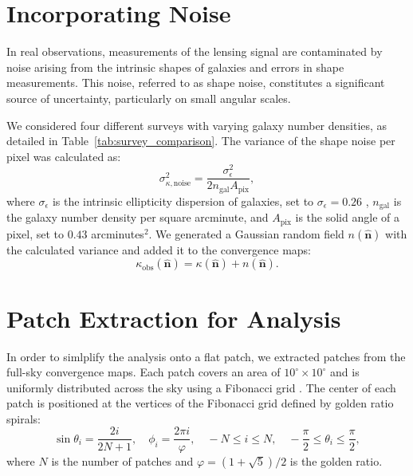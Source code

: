 \section{Incorporating Noise}
In real observations, measurements of the lensing signal are contaminated by noise arising from the intrinsic shapes of galaxies and errors in shape measurements. This noise, referred to as shape noise, constitutes a significant source of uncertainty, particularly on small angular scales.

We considered four different surveys with varying galaxy number densities, as detailed in Table~\ref{tab:survey_comparison}.
The variance of the shape noise per pixel was calculated as:
\begin{equation}
    \sigma_{\kappa, \text{noise}}^2 = \frac{\sigma_{\epsilon}^2}{2 n_{\mathrm{gal}} A_{\mathrm{pix}}},
\end{equation}
where $\sigma_{\epsilon}$ is the intrinsic ellipticity dispersion of galaxies, set to $\sigma_{\epsilon} = 0.26$ \citep{2019A&A...627A..59E}, $n_{\mathrm{gal}}$ is the galaxy number density per square arcminute, and $A_{\mathrm{pix}}$ is the solid angle of a pixel, set to $0.43$ arcminutes$^2$.
We generated a Gaussian random field $n(\hat{\mathbf{n}})$ with the calculated variance and added it to the convergence maps:
\begin{equation}
    \kappa_{\mathrm{obs}}(\hat{\mathbf{n}}) = \kappa(\hat{\mathbf{n}}) + n(\hat{\mathbf{n}}).
\end{equation}

\section{Patch Extraction for Analysis}
In order to simlplify the analysis onto a flat patch, we extracted patches from the full-sky convergence maps. Each patch covers an area of $10^\circ \times 10^\circ$ and is uniformly distributed across the sky using a Fibonacci grid \citep{2006QJRMS.132.1769S, 2023MNRAS.524.5591F}. The center of each patch is positioned at the vertices of the Fibonacci grid defined by golden ratio spirals:
\begin{equation}
    \sin \theta_i = \frac{2i}{2N + 1}, \quad \phi_i = \frac{2 \pi i}{\varphi}, \quad -N \leq i \leq N, \quad -\frac{\pi}{2} \leq \theta_i \leq \frac{\pi}{2},
\end{equation}
where $N$ is the number of patches and $\varphi = (1 + \sqrt{5})/2$ is the golden ratio.

